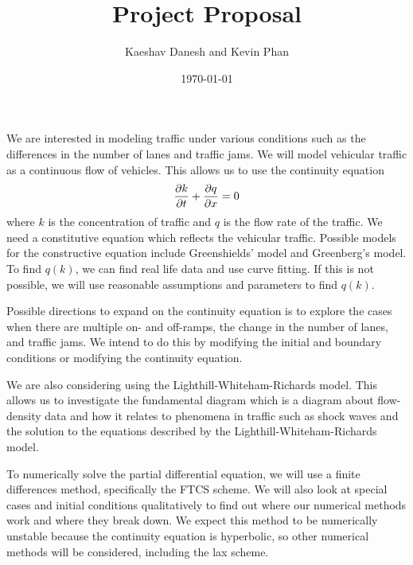 \documentclass[12pt]{article}
\title{Project Proposal}
\author{Kaeshav Danesh and Kevin Phan}
\date{\today}
\begin{document}
	
	\maketitle
    
    
    We are interested in modeling traffic under various conditions such as the differences in the number of lanes and traffic jams. We will model vehicular traffic as a continuous flow of vehicles. This allows us to use the continuity equation 
    \begin{equation}
        \pdv{k}{t} + \pdv{q}{x} = 0
    \end{equation}
    where $k$ is the concentration of traffic and $q$ is the flow rate of the traffic. We need a constitutive equation which reflects the vehicular traffic. Possible models for the constructive equation include Greenshields' model and Greenberg's model. To find $q(k)$, we can find real life data and use curve fitting. If this is not possible, we will use reasonable assumptions and parameters to find $q(k)$. 
    
    Possible directions to expand on the continuity equation is to explore the cases when there are multiple on- and off-ramps, the change in the number of lanes, and traffic jams. We intend to do this by modifying the initial and boundary conditions or modifying the continuity equation. 
    
    We are also considering using the Lighthill-Whiteham-Richards model. This allows us to investigate the fundamental diagram which is a diagram about flow-density data and how it relates to phenomena in traffic such as shock waves and the solution to the equations described by the Lighthill-Whiteham-Richards model.

    To numerically solve the partial differential equation, we will use a finite differences method, specifically the FTCS scheme.  We will also look at special cases and initial conditions qualitatively to find out where our numerical methods work and where they break down. We expect this method to be numerically unstable because the continuity equation is hyperbolic, so other numerical methods will be considered, including the lax scheme. 
\end{document}
